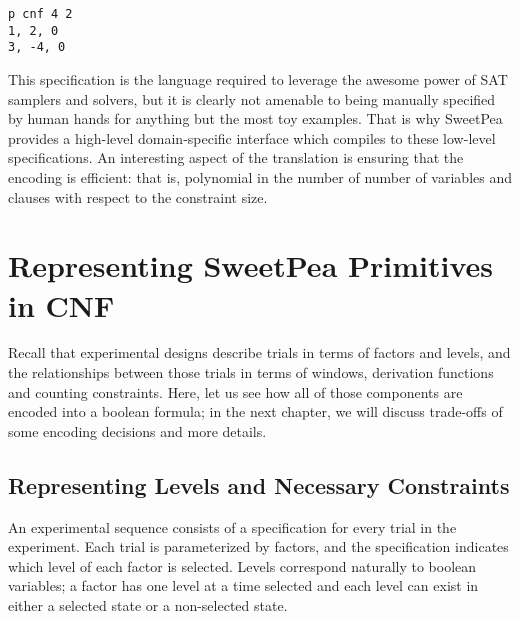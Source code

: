 \begin{verbatim}
p cnf 4 2
1, 2, 0
3, -4, 0
\end{verbatim}


This specification is the language required to leverage the awesome power of SAT samplers and solvers, but it is clearly not amenable to being manually specified by human hands for anything but the most toy examples. That is why SweetPea provides a high-level domain-specific interface which compiles to these low-level specifications. An interesting aspect of the translation is ensuring that the encoding is efficient: that is, polynomial in the number of number of variables and clauses with respect to the constraint size.

\section{Representing SweetPea Primitives in CNF}

Recall that experimental designs describe trials in terms of factors and levels, and the relationships between those trials in terms of windows, derivation functions and counting constraints. Here, let us see how all of those components are encoded into a boolean formula; in the next chapter, we will discuss trade-offs of some encoding decisions and more details.

\subsection{Representing Levels and Necessary Constraints}





An experimental sequence consists of a specification for every trial in the experiment. Each trial is parameterized by factors, and the specification indicates which level of each factor is selected. Levels correspond naturally to boolean variables; a factor has one level at a time selected and each level can exist in either a selected state or a non-selected state.

